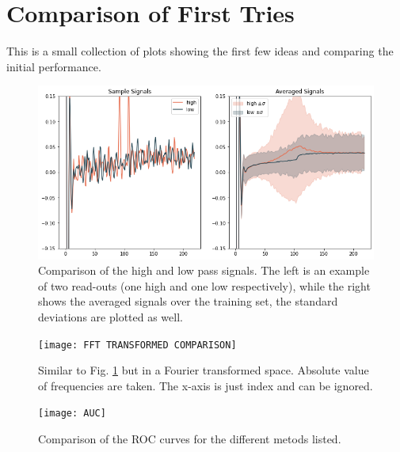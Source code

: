 \newpage
\section*{Comparison of First Tries}
This is a small collection of plots showing the first few ideas and comparing the initial performance. 

\begin{figure}[H]
    \centering
    \includegraphics[width = \textwidth]{Figures/johann_first/sample.png}
    \caption{Comparison of the high and low pass signals. The left is an example of two read-outs (one high and one low respectively), while the right shows the averaged signals over the training set, the standard deviations are plotted as well.}
    \label{fig:samples}
\end{figure}



\begin{figure}
    \centering
    \texttt{[image: FFT TRANSFORMED COMPARISON]}
    \caption{Similar to Fig. \ref{fig:samples} but in a Fourier transformed space. Absolute value of frequencies are taken. The x-axis is just index and can be ignored. }
    \label{fig:samples_fft}
\end{figure}

\begin{figure}
    \centering
    \texttt{[image: AUC]}
    \caption{Comparison of the ROC curves for the different metods listed.}
    \label{fig:AUC_comparison}
\end{figure}

